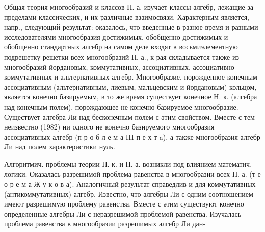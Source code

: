 \documentclass[10pt]{article}
\begin{document}
Общая теория многообразий и классов Н. а. изучает классы алгебр, лежащие за пределами классических, и их различные взаимосвязи. Характерным является, напр., следующий результат: оказалось, что введенные в разное время и разными исследователями многообразия достижимых, обобщенно достижимых и обобщенно стандартных алгебр на самом деле входят в восьмиэлементную подрешетку решетки всех многообразий Н. а., к-рая складывается также из многообразий йордановых, коммутативных, ассоциативных, ассоциативно-коммутативных и альтернативных алгебр. Многообразие, порожденное конечным ассоциативным (альтернативным, лиевым, мальцевским и йордановым) кольцом, является конечно базируемым, в то же время существует конечное Н. к. (алгебра над конечным полем), порождающее не конечно базируемое многообразие. Существует алгебра Ли над бесконечным полем с әтим свойством. Вместе с тем неизвестно (1982) ни одного не конечно базируемого многообразия ассоциативных алгебр (п р о б л е м а III п е х т a), а также многообразия алгебр Ли над полем характеристики нуль.



Алгоритмич. проблемы теории Н. к. и Н. а. возникли под влиянием математич. логики. Оказалась разрешимой проблема равенства в многообразии всех Н. а. (т е о р е м а Ж у к о в а). Аналогичный результат справедлив и для коммутативных (антикоммутативных) алгебр. Известно, что алгебры Ли с одним соотношением имеют разрешимую проблему равенства. Вместе с әтим существуют конечно определенные алгебры Ли с неразрешимой проблемой равенства. Изучалась проблема равенства в многообразии разрешимых алгебр Ли дан-
\end{document}
